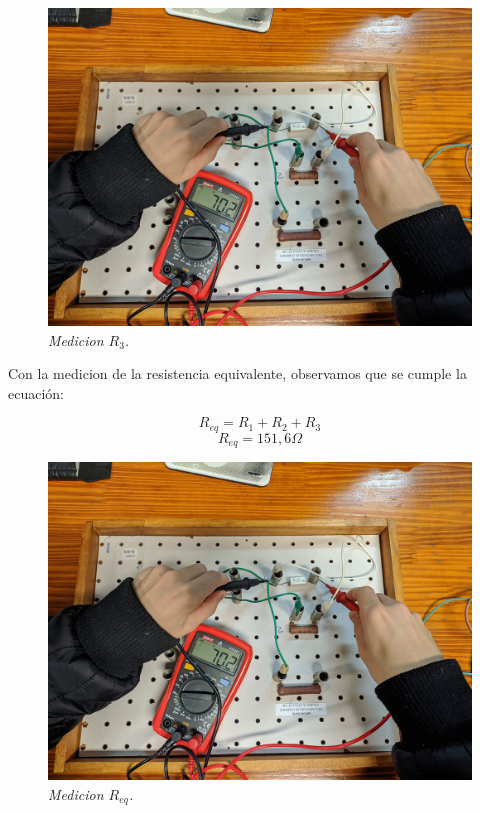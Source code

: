 \documentclass[12pt]{report}
\begin{document}
\begin{figure}[h]
\begin{minipage}[h]{0.3\textwidth}
    \includegraphics[width=1\textwidth]{./pictures/SERIE_R3.jpg}
    \textit{Medicion $R_3$.}
  \end{minipage}
\end{figure}

Con la medicion de la resistencia equivalente, observamos que se cumple la ecuación:

\noindent
\begin{figure}[h]
  \centering
  \begin{minipage}[h]{0.4\textwidth}
    \centering
    \vspace{-2em}
    $$R_{eq}=R_1+R_2+R_3$$
    $$R_{eq} = 151,\!6\Omega$$
  \end{minipage}\hskip 5mm
  \begin{minipage}[h]{0.4\textwidth}
    \centering
    \includegraphics[width=1\textwidth]{./pictures/SERIE_R3.jpg}
    \textit{Medicion $R_{eq}$.}
  \end{minipage}
\end{figure}
\end{document}
